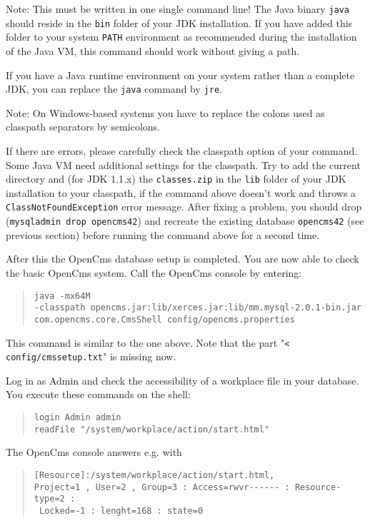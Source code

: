 Note: This must be written in one single command line! The Java binary \texttt{java} should 
reside in the \texttt{bin} folder of your JDK installation. If you have added this folder to your 
system \texttt{PATH} environment as recommended during the installation of the Java VM,
this command should work without giving a path.

If you have a Java runtime environment 
on your system rather than a complete JDK, you
can replace the \texttt{java} command by \texttt{jre}.

Note: On Windows-based systems you have to replace the colons used as classpath separators 
by semicolons.

If there are errors, please carefully check the classpath option of your command.
Some Java VM need additional settings for the classpath. Try to add the current directory 
and (for JDK 1.1.x) the \texttt{classes.zip} in the \texttt{lib} folder of your JDK installation to your 
classpath, if the command above doesn't work and throws a \texttt{ClassNotFoundException} error message.
After fixing a problem, you should drop (\texttt{mysqladmin drop opencms42}) and recreate 
the existing database \texttt{opencms42} (see previous section) before 
running the command above for a second time.

After this the OpenCms database setup is completed. You are now able to check the basic OpenCms system. 
Call the OpenCms console by entering:

\begin{quote}
\texttt{java -mx64M\\
-classpath opencms.jar:lib/xerces.jar:lib/mm.mysql-2.0.1-bin.jar\\
com.opencms.core.CmsShell config/opencms.properties}
\end{quote}

This command is similar to the one above.
Note that the part "\texttt{< config/cmssetup.txt}" is missing now.

Log in as Admin and check the accessibility of a workplace file in your database. 
You execute these commands on the shell: 

\begin{quote}
\texttt{login Admin admin\\
readFile "/system/workplace/action/start.html"}
\end{quote}

The OpenCms console answers e.g. with

\begin{quote}
\begin{verbatim}
[Resource]:/system/workplace/action/start.html,
Project=1 , User=2 , Group=3 : Access=rwvr------ : Resource-type=2 : 
 Locked=-1 : lenght=168 : state=0
\end{verbatim}
\end{quote}

